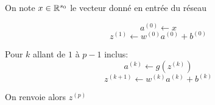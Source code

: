 On note $x\in\mathbb{R}^{s_0}$ le vecteur donné en entrée du réseau

\[a^{(0)} \leftarrow x\]
\[z^{(1)} \leftarrow w^{(0)}a^{(0)} + b^{(0)}\]

Pour $k$ allant de $1$ à $p - 1$ inclus:
\[a^{(k)} \leftarrow g\left(z^{(k)}\right)\]
\[z^{(k + 1)} \leftarrow w^{(k)}a^{(k)} + b^{(k)}\]

On renvoie alors $z^{(p)}$
